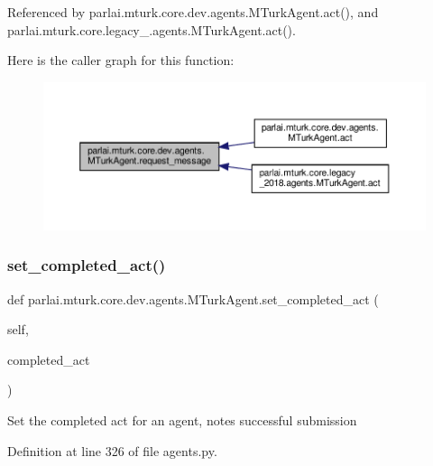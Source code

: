 Referenced by parlai.\+mturk.\+core.\+dev.\+agents.\+M\+Turk\+Agent.\+act(), and parlai.\+mturk.\+core.\+legacy\+\_.\+agents.\+M\+Turk\+Agent.\+act().

Here is the caller graph for this function\+:
\nopagebreak
\begin{figure}[H]
\begin{center}
\leavevmode
\includegraphics[width=350pt]{classparlai_1_1mturk_1_1core_1_1dev_1_1agents_1_1MTurkAgent_aac39e834ecff137bc0cfbb584c4d6c7f_icgraph}
\end{center}
\end{figure}
\mbox{\label{classparlai_1_1mturk_1_1core_1_1dev_1_1agents_1_1MTurkAgent_a165678febc290547dfdbcf03eda747ba}} 
\subsubsection{\texorpdfstring{set\+\_\+completed\+\_\+act()}{set\_completed\_act()}}
{\footnotesize\ttfamily def parlai.\+mturk.\+core.\+dev.\+agents.\+M\+Turk\+Agent.\+set\+\_\+completed\+\_\+act (\begin{DoxyParamCaption}\item[{}]{self,  }\item[{}]{completed\+\_\+act }\end{DoxyParamCaption})}

\begin{DoxyVerb}Set the completed act for an agent, notes successful submission\end{DoxyVerb}
 

Definition at line 326 of file agents.\+py.

